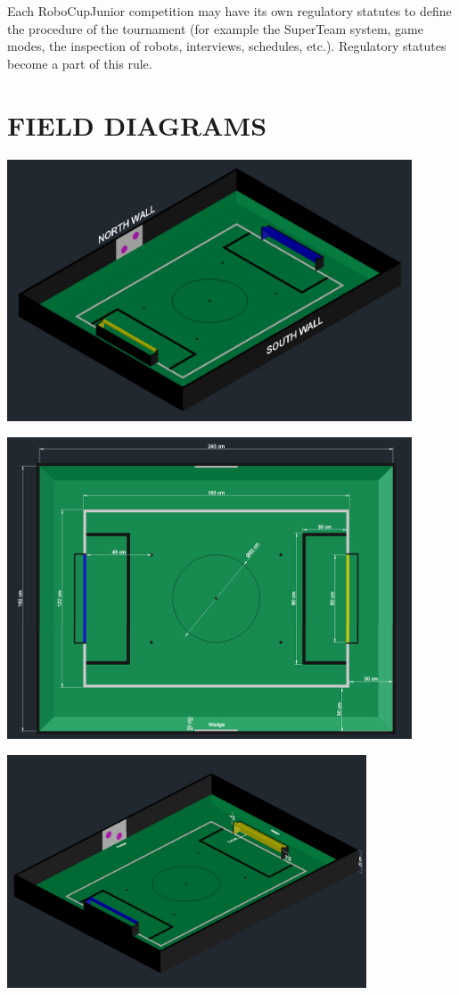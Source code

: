 \documentclass{article}
\begin{document}
Each RoboCupJunior competition may have its own regulatory statutes to define
the procedure of the tournament (for example the SuperTeam system, game modes,
the inspection of robots, interviews, schedules, etc.). Regulatory statutes
become a part of this rule.

\section*{FIELD DIAGRAMS}

\begin{center}

\includegraphics[width=0.9\textwidth]{media/image5_new.jpeg}

\includegraphics[width=0.9\textwidth]{media/image6_new.jpeg}

\includegraphics[width=0.8\textwidth]{media/image7_new.jpeg}

\end{center}
\end{document}

